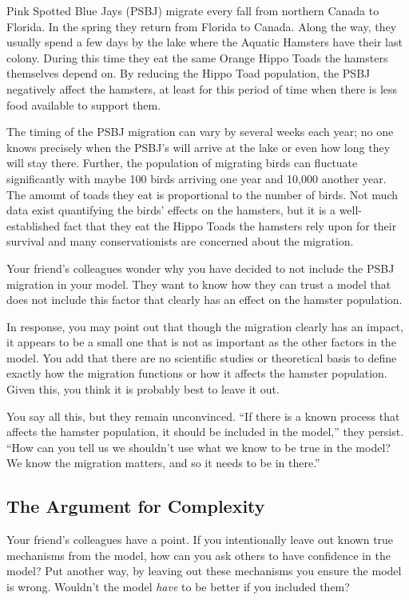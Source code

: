 \documentclass[]{memoir}
\begin{document}
Pink Spotted Blue Jays (PSBJ) migrate every fall from northern Canada to
Florida. In the spring they return from Florida to Canada. Along the
way, they usually spend a few days by the lake where the Aquatic
Hamsters have their last colony. During this time they eat the same
Orange Hippo Toads the hamsters themselves depend on. By reducing the
Hippo Toad population, the PSBJ negatively affect the hamsters, at least
for this period of time when there is less food available to support
them.

The timing of the PSBJ migration can vary by several weeks each year; no
one knows precisely when the PSBJ's will arrive at the lake or even how
long they will stay there. Further, the population of migrating birds
can fluctuate significantly with maybe 100 birds arriving one year and
10,000 another year. The amount of toads they eat is proportional to the
number of birds. Not much data exist quantifying the birds' effects on
the hamsters, but it is a well-established fact that they eat the Hippo
Toads the hamsters rely upon for their survival and many
conservationists are concerned about the migration.

Your friend's colleagues wonder why you have decided to not include the
PSBJ migration in your model. They want to know how they can trust a
model that does not include this factor that clearly has an effect on
the hamster population.

In response, you may point out that though the migration clearly has an
impact, it appears to be a small one that is not as important as the
other factors in the model. You add that there are no scientific studies
or theoretical basis to define exactly how the migration functions or
how it affects the hamster population. Given this, you think it is
probably best to leave it out.

You say all this, but they remain unconvinced. ``If there is a known
process that affects the hamster population, it should be included in
the model,'' they persist. ``How can you tell us we shouldn't use what
we know to be true in the model? We know the migration matters, and so
it needs to be in there.''

\subsection{The Argument for Complexity}

Your friend's colleagues have a point. If you intentionally leave out
known true mechanisms from the model, how can you ask others to have
confidence in the model? Put another way, by leaving out these
mechanisms you ensure the model is wrong. Wouldn't the model \emph{have}
to be better if you included them?
\end{document}
